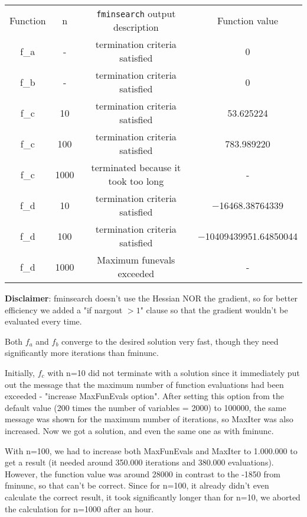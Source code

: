 \documentclass{article}
\begin{document}
    \begin{center}
        \begin{tabular}{ |c|c|c|c| }
        \hline
        Function & n & \texttt{fminsearch} output description & Function value\\
        f_a & - & termination criteria satisfied & 0 \\
        f_b & - & termination criteria satisfied &  0 \\
        f_c & 10 & termination criteria satisfied & 53.625224 \\
        f_c & 100 & termination criteria satisfied & 783.989220 \\
        f_c & 1000 & terminated because it took too long & - \\
        f_d & 10 & termination criteria satisfied & −16468.38764339 \\
        f_d & 100 & termination criteria satisfied & −10409439951.64850044 \\
        f_d & 1000 & Maximum funevals exceeded & - \\
        \hline
        \end{tabular}
    \end{center}

    \textbf{Disclaimer}: fminsearch doesn't use the Hessian NOR the gradient, so for better efficiency we added a "if nargout $> 1$" clause so that the gradient wouldn't be evaluated every time.
    
    Both $f_a$ and $f_b$ converge to the desired solution very fast, though they need significantly more iterations than fminunc.

    Initially, $f_c$ with n=10 did not terminate with a solution since it immediately put out the message that the maximum number of function evaluations had been exceeded - "increase MaxFunEvals option". After setting this option from the default value (200 times the number of variables = 2000) to 100000, the same message was shown for the maximum number of iterations, so MaxIter was also increased. Now we got a solution, and even the same one as with fminunc.

    With n=100, we had to increase both MaxFunEvals and MaxIter to 1.000.000 to get a result (it needed around 350.000 iterations and 380.000 evaluations). However, the function value was around 28000 in contrast to the -1850 from fminunc, so that can't be correct. Since for n=100, it already didn't even calculate the correct result, it took significantly longer than for n=10, we aborted the calculation for n=1000 after an hour.
\end{document}
